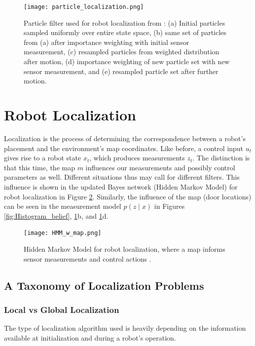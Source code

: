 \documentclass[twoside]{article}
\begin{document}
\begin{figure}[p]
\centering
\texttt{[image: particle\_localization.png]}
\caption{Particle filter used for robot localization from \cite{thrun2005probabilistic}: (a) Initial particles sampled uniformly over entire state space, (b) same set of particles from (a) after importance weighting with initial sensor measurement, (c) resampled particles from weighted distribution after motion, (d) importance weighting of new particle set with new sensor measurement, and (e) resampled particle set after further motion.}
\label{fig:Particle_filter}
\end{figure}

\section{Robot Localization}
Localization is the process of determining the correspondence between a robot's placement and the environment's map coordinates. Like before, a control input $u_t$ gives rise to a robot state $x_t$, which produces measurements $z_t$. The distinction is that this time, the map $m$ influences our measurements and possibly control parameters as well. Different situations thus may call for different filters. This influence is shown in the updated Bayes network (Hidden Markov Model) for robot localization in Figure \ref{fig:HMM_with_map}. Similarly, the influence of the map (door locations) can be seen in the measurement model $p(z \mid x)$ in Figures \ref{fig:Histogram_belief},
\ref{fig:Particle_filter}b, and \ref{fig:Particle_filter}d.

\begin{figure}[H]
\centering
\texttt{[image: HMM\_w\_map.png]}
\caption{Hidden Markov Model for robot localization, where a map informs sensor measurements and control actions \cite{Xmisc}.}
\label{fig:HMM_with_map}
\end{figure}

\subsection{A Taxonomy of Localization Problems}
    \subsubsection{Local vs Global Localization}
    The type of localization algorithm used is heavily depending on the information available at initialization and during a robot's operation.
    
\end{document}
